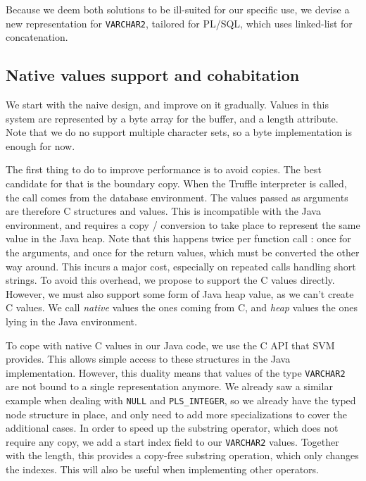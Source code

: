 \documentclass[twoside,11pt,a4paper]{article}
\newcommand{\java}[1]{\textsf{#1}}
\newcommand{\pls}[1]{\texttt{#1}}
\newcommand{\plstype}[1]{\pls{#1}}
\newcommand{\varchar}{\plstype{VARCHAR2}}
\newcommand{\plsi}{\plstype{PLS\_INTEGER}}
\newcommand{\plsnull}{\pls{NULL}}
\begin{document}
Because we deem both solutions to be ill-suited for our specific use, we devise a new representation for \varchar{}, tailored for PL/SQL, which uses linked-list for concatenation.

\subsection{Native values support and cohabitation}


We start with the naive design, and improve on it gradually. Values in this system are represented by a \java{byte} array for the buffer, and a length attribute. Note that we do no support multiple character sets, so a \java{byte} implementation is enough for now.

The first thing to do to improve performance is to avoid copies. The best candidate for that is the boundary copy. When the Truffle interpreter is called, the call comes from the database environment. The values passed as arguments are therefore C structures and values. This is incompatible with the Java environment, and requires a copy / conversion to take place to represent the same value in the Java heap. Note that this happens twice per function call : once for the arguments, and once for the return values, which must be converted the other way around. This incurs a major cost, especially on repeated calls handling short strings. To avoid this overhead, we propose to support the C values directly. However, we must also support some form of Java heap value, as we can't create C values. We call \textit{native} values the ones coming from C, and \textit{heap} values the ones lying in the Java environment.

To cope with native C values in our Java code, we use the C API that SVM provides. This allows simple access to these structures in the Java implementation. However, this duality means that values of the type \varchar{} are not bound to a single representation anymore. We already saw a similar example when dealing with \plsnull{} and \plsi{}, so we already have the typed node structure in place, and only need to add more specializations to cover the additional cases. In order to speed up the substring operator, which does not require any copy, we add a start index field to our \varchar{} values. Together with the length, this provides a copy-free substring operation, which only changes the indexes. This will also be useful when implementing other operators.
\end{document}
